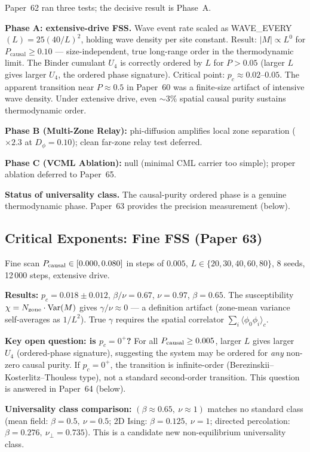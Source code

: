\documentclass[11pt]{article}
\begin{document}
Paper~62 ran three tests; the decisive result is Phase~A.

\textbf{Phase A: extensive-drive FSS.}
Wave event rate scaled as WAVE\_EVERY$(L) = 25(40/L)^2$, holding wave density
per site constant.
Result: $|M| \propto L^{0}$ for $P_\mathrm{causal} \geq 0.10$ --- size-independent,
true long-range order in the thermodynamic limit.
The Binder cumulant $U_4$ is correctly ordered by $L$ for $P > 0.05$
(larger $L$ gives larger $U_4$, the ordered phase signature).
Critical point: $p_c \approx 0.02$--$0.05$.
The apparent transition near $P \approx 0.5$ in Paper~60 was a finite-size artifact
of intensive wave density.
Under extensive drive, even $\sim 3\%$ spatial causal purity sustains thermodynamic order.

\textbf{Phase B (Multi-Zone Relay):} phi-diffusion amplifies local zone separation
($\times 2.3$ at $D_\phi=0.10$); clean far-zone relay test deferred.

\textbf{Phase C (VCML Ablation):} null (minimal CML carrier too simple);
proper ablation deferred to Paper~65.

\textbf{Status of universality class.}
The causal-purity ordered phase is a genuine thermodynamic phase.
Paper~63 provides the precision measurement (below).

\subsection{Critical Exponents: Fine FSS (Paper 63)}

Fine scan $P_{\rm causal} \in [0.000, 0.080]$ in steps of $0.005$,
$L \in \{20,30,40,60,80\}$, 8 seeds, 12\,000 steps, extensive drive.

\textbf{Results:}
$p_c = 0.018 \pm 0.012$,
$\beta/\nu = 0.67$, $\nu = 0.97$, $\beta = 0.65$.
The susceptibility $\chi = N_{\rm zone} \cdot \mathrm{Var}(M)$ gives $\gamma/\nu \approx 0$
--- a definition artifact (zone-mean variance self-averages as $1/L^2$).
True $\gamma$ requires the spatial correlator $\sum_i \langle\phi_0\phi_i\rangle_c$.

\textbf{Key open question: is $p_c = 0^+$?}
For all $P_{\rm causal} \geq 0.005$, larger $L$ gives larger $U_4$ (ordered-phase signature),
suggesting the system may be ordered for \emph{any} non-zero causal purity.
If $p_c = 0^+$, the transition is infinite-order (Berezinskii--Kosterlitz--Thouless type),
not a standard second-order transition.
This question is answered in Paper~64 (below).

\textbf{Universality class comparison:}
$(\beta \approx 0.65,\ \nu \approx 1)$ matches no standard class
(mean field: $\beta=0.5,\ \nu=0.5$;
2D Ising: $\beta=0.125,\ \nu=1$;
directed percolation: $\beta=0.276,\ \nu_\perp=0.735$).
This is a candidate new non-equilibrium universality class.
\end{document}
